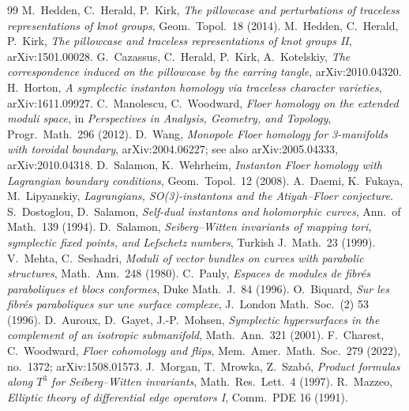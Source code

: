 \begin{thebibliography}{99}
 M.~Hedden, C.~Herald, P.~Kirk, \emph{The pillowcase and perturbations of traceless representations of knot groups}, Geom.\ Topol.\ 18 (2014).
 M.~Hedden, C.~Herald, P.~Kirk, \emph{The pillowcase and traceless representations of knot groups II}, arXiv:1501.00028.
 G.~Cazassus, C.~Herald, P.~Kirk, A.~Kotelskiy, \emph{The correspondence induced on the pillowcase by the earring tangle}, arXiv:2010.04320.
 H.~Horton, \emph{A symplectic instanton homology via traceless character varieties}, arXiv:1611.09927.
 C.~Manolescu, C.~Woodward, \emph{Floer homology on the extended moduli space}, in \emph{Perspectives in Analysis, Geometry, and Topology}, Progr.\ Math.\ 296 (2012).
 D.~Wang, \emph{Monopole Floer homology for 3-manifolds with toroidal boundary}, arXiv:2004.06227; see also arXiv:2005.04333, arXiv:2010.04318.
 D.~Salamon, K.~Wehrheim, \emph{Instanton Floer homology with Lagrangian boundary conditions}, Geom.\ Topol.\ 12 (2008).
 A.~Daemi, K.~Fukaya, M.~Lipyanskiy, \emph{Lagrangians, SO(3)-instantons and the Atiyah--Floer conjecture}.
 S.~Dostoglou, D.~Salamon, \emph{Self-dual instantons and holomorphic curves}, Ann.\ of Math.\ 139 (1994).
 D.~Salamon, \emph{Seiberg--Witten invariants of mapping tori, symplectic fixed points, and Lefschetz numbers}, Turkish J.\ Math.\ 23 (1999).
 V.~Mehta, C.~Seshadri, \emph{Moduli of vector bundles on curves with parabolic structures}, Math.\ Ann.\ 248 (1980).
 C.~Pauly, \emph{Espaces de modules de fibr\'es paraboliques et blocs conformes}, Duke Math.\ J.\ 84 (1996).
 O.~Biquard, \emph{Sur les fibr\'es paraboliques sur une surface complexe}, J.\ London Math.\ Soc.\ (2) 53 (1996).
 D.~Auroux, D.~Gayet, J.-P.~Mohsen, \emph{Symplectic hypersurfaces in the complement of an isotropic submanifold}, Math.\ Ann.\ 321 (2001).
 F.~Charest, C.~Woodward, \emph{Floer cohomology and flips}, Mem.\ Amer.\ Math.\ Soc.\ 279 (2022), no.\ 1372; arXiv:1508.01573.
 J.~Morgan, T.~Mrowka, Z.~Szab\'o, \emph{Product formulas along $T^3$ for Seiberg--Witten invariants}, Math.\ Res.\ Lett.\ 4 (1997).
 R.~Mazzeo, \emph{Elliptic theory of differential edge operators I}, Comm.\ PDE 16 (1991).

\end{thebibliography}
